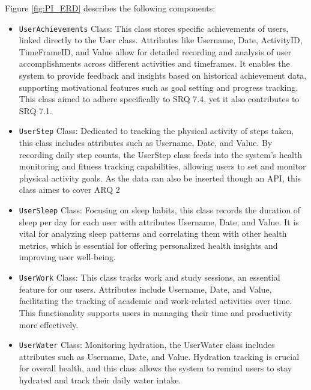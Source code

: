 \documentclass[12pt]{article}
\begin{document}
\newpage

Figure \ref{fig:PI_ERD} describes the following components:

\begin{itemize}

    \item \texttt{UserAchievements} Class: This class stores specific
        achievements of users, linked directly to the User class. Attributes
        like Username, Date, ActivityID, TimeFrameID, and Value allow for
        detailed recording and analysis of user accomplishments across
        different activities and timeframes. It enables the system to provide
        feedback and insights based on historical achievement data, supporting
        motivational features such as goal setting and progress tracking. This 
        class aimed to adhere specifically to SRQ 7.4, yet it also contributes to SRQ 7.1.\par

    \item \texttt{UserStep} Class: Dedicated to tracking the physical activity
        of steps taken, this class includes attributes such as Username, Date,
        and Value. By recording daily step counts, the UserStep class feeds
        into the system’s health monitoring and fitness tracking capabilities,
        allowing users to set and monitor physical activity goals. As the data 
        can also be inserted though an API, this class aimes to cover ARQ 2\par

    \item \texttt{UserSleep} Class: Focusing on sleep habits, this class
        records the duration of sleep per day for each user with attributes
        Username, Date, and Value. It is vital for analyzing sleep patterns
        and correlating them with other health metrics, which is essential for
        offering personalized health insights and improving user
        well-being.\par

    \item \texttt{UserWork} Class: This class tracks work and study sessions,
        an essential feature for our users. Attributes include
        Username, Date, and Value, facilitating the tracking of
        academic and work-related activities over time. This functionality
        supports users in managing their time and productivity more
        effectively.\par

    \item \texttt{UserWater} Class: Monitoring hydration, the UserWater class
        includes attributes such as Username, Date, and Value. Hydration
        tracking is crucial for overall health, and this class allows the
        system to remind users to stay hydrated and track their daily water
        intake.\par


\end{itemize}
\end{document}
